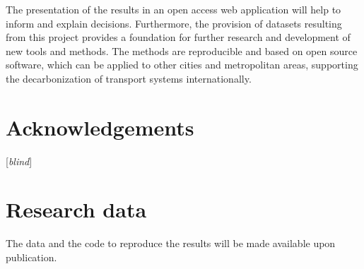\documentclass[review, doubleblind, 3p,
authoryear]{elsarticle} %
\begin{document}
The presentation of the results in an open access web application will
help to inform and explain decisions. Furthermore, the provision of
datasets resulting from this project provides a foundation for further
research and development of new tools and methods. The methods are
reproducible and based on open source software, which can be applied to
other cities and metropolitan areas, supporting the decarbonization of
transport systems internationally.

\section*{Acknowledgements}\label{acknowledgements}

{[}\emph{blind}{]}

\section*{Research data}\label{research-data}

The data and the code to reproduce the results will be made available
upon publication.

\renewcommand\refname{References}

\end{document}
